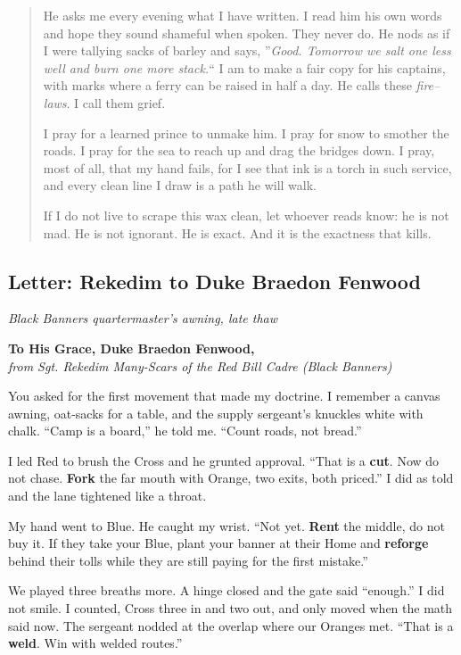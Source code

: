 \documentclass[11pt]{article}
\begin{document}
\begin{quote}
He asks me every evening what I have written. I read him his own words and hope they sound shameful when spoken. They never do. He nods as if I were tallying sacks of barley and says, ''\emph{Good. Tomorrow we salt one less well and burn one more stack.}`` I am to make a fair copy for his captains, with marks where a ferry can be raised in half a day. He calls these \emph{fire--laws}. I call them grief.

I pray for a learned prince to unmake him. I pray for snow to smother the roads. I pray for the sea to reach up and drag the bridges down. I pray, most of all, that my hand fails, for I see that ink is a torch in such service, and every clean line I draw is a path he will walk.

If I do not live to scrape this wax clean, let whoever reads know: he is not mad. He is not ignorant. He is exact. And it is the exactness that kills.
\end{quote}

\clearpage

\subsection{Letter: Rekedim to Duke Braedon Fenwood}

\noindent\textit{Black Banners quartermaster's awning, late thaw}

\medskip
\noindent\textbf{To His Grace, Duke Braedon Fenwood,}\\
\textit{from Sgt. Rekedim Many-Scars of the Red Bill Cadre (Black Banners)} 

\medskip
You asked for the first movement that made my doctrine. I remember a canvas awning, oat-sacks for a table, and the supply sergeant's knuckles white with chalk. ``Camp is a board,'' he told me. ``Count roads, not bread.''

I led Red to brush the Cross and he grunted approval. ``That is a \textbf{cut}. Now do not chase. \textbf{Fork} the far mouth with Orange, two exits, both priced.'' I did as told and the lane tightened like a throat.

My hand went to Blue. He caught my wrist. ``Not yet. \textbf{Rent} the middle, do not buy it. If they take your Blue, plant your banner at their Home and \textbf{reforge} behind their tolls while they are still paying for the first mistake.''

We played three breaths more. A hinge closed and the gate said ``enough.'' I did not smile. I counted, Cross three in and two out, and only moved when the math said now. The sergeant nodded at the overlap where our Oranges met. ``That is a \textbf{weld}. Win with welded routes.''
\end{document}
